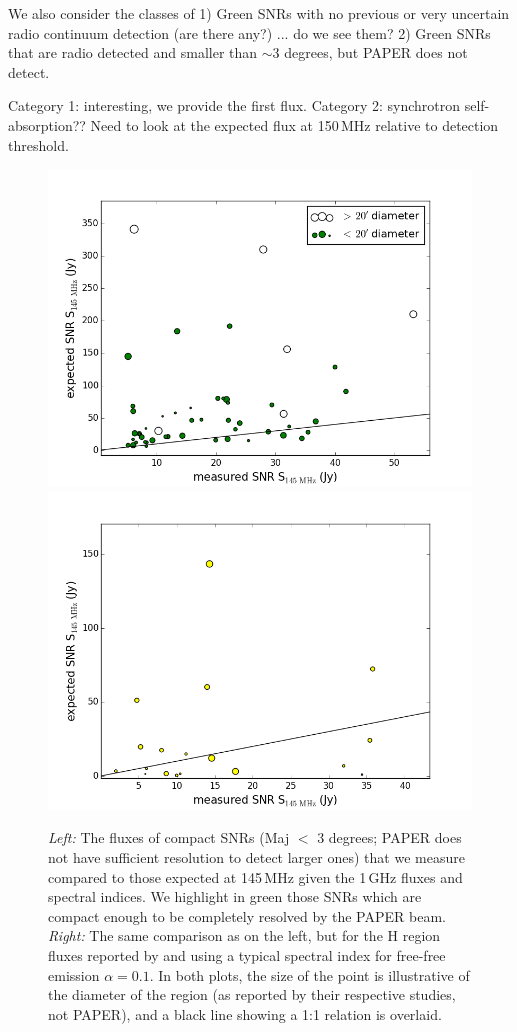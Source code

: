 \documentclass[useAMS,usenatbib]{mn2e}
\begin{document}
We also consider the classes of 1) Green SNRs with no previous or very
uncertain radio continuum detection (are there any?) ... do we see
them?  2) Green SNRs that are radio detected and smaller than $\sim3$
degrees, but PAPER does not detect.

Category 1: interesting, we provide the first flux.  Category 2:
synchrotron self-absorption??  Need to look at the expected flux at
150\,MHz relative to detection threshold.  

\begin{figure}
\centering
\includegraphics[scale=.4]{GreenScatter.png}
\includegraphics[scale=.4]{PaladiniScatter.png}
\caption{\textit{Left:} The fluxes of compact SNRs (Maj $<$ 3 degrees; PAPER does not have sufficient resolution to detect larger ones) that we measure compared to those expected at 145\,MHz given the \protect\cite{DAGreen.14} 1\,GHz fluxes and spectral indices. We highlight in green those SNRs which are compact enough to be completely resolved by the PAPER beam. \textit{Right:} The same comparison as on the left, but for the H{} region fluxes reported by \protect\cite{Paladini.03} and using a typical spectral index for free-free emission $\alpha=0.1$. In both plots, the size of the point is illustrative of the diameter of the region (as reported by their respective studies, not PAPER), and a black line showing a 1:1 relation is overlaid.}

\end{figure}
\end{document}

